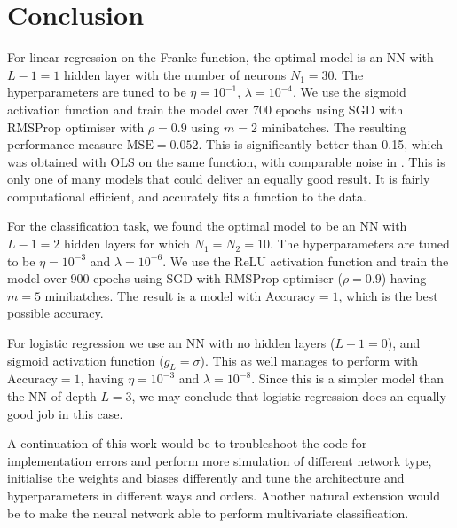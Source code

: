 \section{Conclusion}\label{sec:conclusion}

For linear regression on the Franke function, the optimal model is an NN with $L-1=1$ hidden layer with the number of neurons $N_1=30$. The hyperparameters are tuned to be $\eta=10^{-1}$, $\lambda=10^{-4}$. We use the sigmoid activation function and train the model over 700 epochs using SGD with RMSProp optimiser with $\rho=0.9$ using $m=2$ minibatches. The resulting performance measure $\mathrm{MSE} = 0.052$. This is significantly better than 0.15, which was obtained with OLS on the same function, with comparable noise in \projectOne. This is only one of many models that could deliver an equally good result. It is fairly computational efficient, and accurately fits a function to the data. 

For the classification task, we found the optimal model to be an NN with $L-1=2$ hidden layers for which $N_1=N_2=10$. The hyperparameters are tuned to be $\eta=10^{-3}$ and $\lambda=10^{-6}$. We use the ReLU activation function and train the model over 900 epochs using SGD with RMSProp optimiser ($\rho=0.9$) having $m=5$ minibatches. The result is a model with $\mathrm{Accuracy}=1$, which is the best possible accuracy. 

For logistic regression we use an NN with no hidden layers ($L-1=0$), and sigmoid activation function ($g_L=\sigma$). This as well manages to perform with $\mathrm{Accuracy}=1$, having $\eta=10^{-3}$ and $\lambda=10^{-8}$. Since this is a simpler model than the NN of depth $L=3$, we may conclude that logistic regression does an equally good job in this case. 

A continuation of this work would be to troubleshoot the code for implementation errors and perform more simulation of different network type, initialise the weights and biases differently and tune the architecture and hyperparameters in different ways and orders. Another natural extension would be to make the neural network able to perform multivariate classification. 